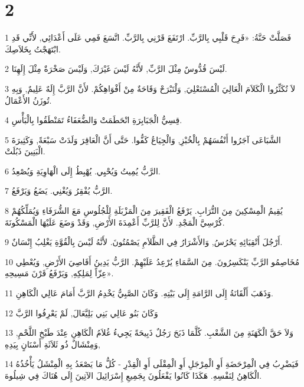 \chapter{2}

\par 1 فَصَلَّتْ حَنَّةُ: «فَرِحَ قَلْبِي بِالرَّبِّ. ارْتَفَعَ قَرْنِي بِالرَّبِّ. اتَّسَعَ فَمِي عَلَى أَعْدَائِي, لأَنِّي قَدِ ابْتَهَجْتُ بِخَلاَصِكَ.
\par 2 لَيْسَ قُدُّوسٌ مِثْلَ الرَّبِّ, لأَنَّهُ لَيْسَ غَيْرَكَ, وَلَيْسَ صَخْرَةٌ مِثْلَ إِلَهِنَا.
\par 3 لاَ تُكَثِّرُوا الْكَلاَمَ الْعَالِيَ الْمُسْتَعْلِيَ, وَلْتَبْرَحْ وَقَاحَةٌ مِنْ أَفْوَاهِكُمْ. لأَنَّ الرَّبَّ إِلَهٌ عَلِيمٌ, وَبِهِ تُوزَنُ الأَعْمَالُ.
\par 4 قِسِيُّ الْجَبَابِرَةِ انْحَطَمَتْ وَالضُّعَفَاءُ تَمَنْطَقُوا بِالْبَأْسِ.
\par 5 الشَّبَاعَى آجَرُوا أَنْفُسَهُمْ بِالْخُبْزِ, وَالْجِيَاعُ كَفُّوا. حَتَّى أَنَّ الْعَاقِرَ وَلَدَتْ سَبْعَةً, وَكَثِيرَةَ الْبَنِينَ ذَبُلَتْ.
\par 6 الرَّبُّ يُمِيتُ وَيُحْيِي. يُهْبِطُ إِلَى الْهَاوِيَةِ وَيُصْعِدُ.
\par 7 الرَّبُّ يُفْقِرُ وَيُغْنِي. يَضَعُ وَيَرْفَعُ.
\par 8 يُقِيمُ الْمِسْكِينَ مِنَ التُّرَابِ. يَرْفَعُ الْفَقِيرَ مِنَ الْمَزْبَلَةِ لِلْجُلُوسِ مَعَ الشُّرَفَاءِ وَيُمَلِّكُهُمْ كُرْسِيَّ الْمَجْدِ. لأَنَّ لِلرَّبِّ أَعْمِدَةَ الأَرْضِ, وَقَدْ وَضَعَ عَلَيْهَا الْمَسْكُونَةَ.
\par 9 أَرْجُلَ أَتْقِيَائِهِ يَحْرُسُ, وَالأَشْرَارُ فِي الظَّلاَمِ يَصْمُتُونَ. لأَنَّهُ لَيْسَ بِالْقُوَّةِ يَغْلِبُ إِنْسَانٌ.
\par 10 مُخَاصِمُو الرَّبِّ يَنْكَسِرُونَ. مِنَ السَّمَاءِ يُرْعِدُ عَلَيْهِمْ. الرَّبُّ يَدِينُ أَقَاصِيَ الأَرْضِ, وَيُعْطِي عِزّاً لِمَلِكِهِ, وَيَرْفَعُ قَرْنَ مَسِيحِهِ».
\par 11 وَذَهَبَ أَلْقَانَةُ إِلَى الرَّامَةِ إِلَى بَيْتِهِ. وَكَانَ الصَّبِيُّ يَخْدِمُ الرَّبَّ أَمَامَ عَالِي الْكَاهِنِ.
\par 12 وَكَانَ بَنُو عَالِي بَنِي بَلِيَّعَالَ, لَمْ يَعْرِفُوا الرَّبَّ
\par 13 وَلاَ حَقَّ الْكَهَنَةِ مِنَ الشَّعْبِ. كُلَّمَا ذَبَحَ رَجُلٌ ذَبِيحَةً يَجِيءُ غُلاَمُ الْكَاهِنِ عِنْدَ طَبْخِ اللَّحْمِ, وَمِنْشَالٌ ذُو ثَلاَثَةِ أَسْنَانٍ بِيَدِهِ,
\par 14 فَيَضْرِبُ فِي الْمِرْحَضَةِ أَوِ الْمِرْجَلِ أَوِ الْمِقْلَى أَوِ الْقِدْرِ - كُلُّ مَا يَصْعَدُ بِهِ الْمِنْشَلُ يَأْخُذُهُ الْكَاهِنُ لِنَفْسِهِ. هَكَذَا كَانُوا يَفْعَلُونَ بِجَمِيعِ إِسْرَائِيلَ الآتِينَ إِلَى هُنَاكَ فِي شِيلُوهَ.
